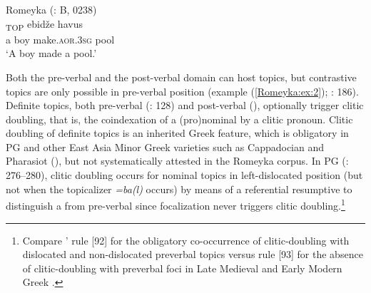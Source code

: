 \documentclass[output=paper,colorlinks,citecolor=brown]{langscibook}
\begin{document}
\ea\label{Romeyka:ex:1}
Romeyka (\citealt{schreiber2021pontic}: B, 0238) \\
\textsubscript{TOP} ebidže havus \\
a boy make\textsc{.aor.3sg} pool \\
\glt `A boy made a pool.'  \\
\z


Both the pre-verbal and the post-verbal domain can host topics, but contrastive topics are only possible in pre-verbal position (example (\ref{Romeyka:ex:2}); \citealt{neocleous_word_2020}: 186). Definite  topics, both pre-verbal (\citealt{neocleous_word_2020}: 128) and post-verbal (\citealt{schreiber2021pontic}), optionally trigger clitic doubling, that is, the coindexation of a (pro)nominal   by a clitic pronoun. Clitic doubling of definite  topics is an inherited Greek feature, which is obligatory in PG and other East Asia Minor Greek varieties such as Cappadocian and Pharasiot (\citealt{janseClitic2008}), but not systematically attested in the Romeyka corpus. In PG (\citealt{drettasPontic1997}: 276--280), clitic doubling occurs for nominal  topics in left-dislocated position (but not when the topicalizer \textit{=ba(l)} occurs) by means of a referential resumptive  to distinguish a  from pre-verbal  since focalization never triggers clitic doubling.\footnote{Compare \citeauthor{horrocksCambridge2019}' \citeyear{horrocksCambridge2019} rule [92] for the obligatory co-occurrence of clitic-doubling with dislocated and non-dislocated preverbal topics versus rule [93] for the absence of clitic-doubling with preverbal foci in Late Medieval and Early Modern Greek \citep[2024--2025]{horrocksCambridge2019}.} 
\end{document}
